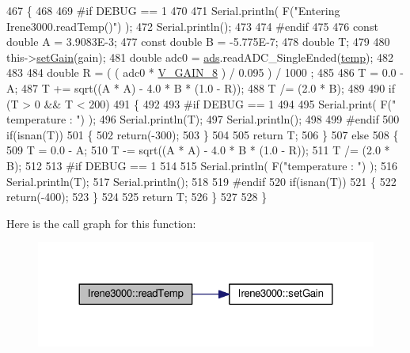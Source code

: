 \begin{DoxyCode}
467 \{
468 
469 \textcolor{preprocessor}{#if DEBUG == 1 }
470 
471     Serial.println( F(\textcolor{stringliteral}{"Entering Irene3000.readTemp()"}) );
472     Serial.println();
473 
474 \textcolor{preprocessor}{#endif}
475 
476     \textcolor{keyword}{const} \textcolor{keywordtype}{double} A = 3.9083E-3;
477     \textcolor{keyword}{const} \textcolor{keywordtype}{double} B = -5.775E-7;
478     \textcolor{keywordtype}{double} T;
479 
480     this->\hyperlink{classIrene3000_aff7c5da186b388e7272e63ff88a20c34}{setGain}(gain);
481     \textcolor{keywordtype}{double} adc0 = \hyperlink{classIrene3000_a1215e77ba761c9908d80d691f149e135}{ads}.readADC\_SingleEnded(\hyperlink{Irene3000_8h_a5905d48604152cf57aa6bfa087b49173}{temp});
482 
483 
484     \textcolor{keywordtype}{double} R = ( ( adc0 * \hyperlink{Irene3000_8h_ab7ab16df599d3f0ce29e12791a504891}{V\_GAIN\_8} ) / 0.095 ) / 1000 ;
485 
486     T = 0.0 - A;
487     T += sqrt((A * A) - 4.0 * B * (1.0 - R));
488     T /= (2.0 * B);
489 
490     \textcolor{keywordflow}{if} (T > 0 && T < 200) 
491     \{
492 
493 \textcolor{preprocessor}{    #if DEBUG == 1 }
494 
495         Serial.print( F(\textcolor{stringliteral}{" temperature : "}) );
496         Serial.println(T);
497         Serial.println();
498     
499 \textcolor{preprocessor}{    #endif }
500         \textcolor{keywordflow}{if}(isnan(T))
501         \{
502             \textcolor{keywordflow}{return}(-300);           
503         \}
504 
505         \textcolor{keywordflow}{return} T;
506     \}
507     \textcolor{keywordflow}{else} 
508     \{
509         T = 0.0 - A;
510         T -= sqrt((A * A) - 4.0 * B * (1.0 - R));
511         T /= (2.0 * B);
512     
513 \textcolor{preprocessor}{    #if DEBUG == 1 }
514     
515         Serial.println( F(\textcolor{stringliteral}{"temperature : "}) );
516         Serial.println(T);
517         Serial.println();
518     
519 \textcolor{preprocessor}{    #endif}
520         \textcolor{keywordflow}{if}(isnan(T))
521         \{
522             \textcolor{keywordflow}{return}(-400);           
523         \}
524 
525         \textcolor{keywordflow}{return} T;
526     \}
527 
528 \}
\end{DoxyCode}
Here is the call graph for this function\+:\nopagebreak
\begin{figure}[H]
\begin{center}
\leavevmode
\includegraphics[width=324pt]{classIrene3000_a94ad40f281d83ad1be20bf1edd6fe802_cgraph}
\end{center}
\end{figure}
